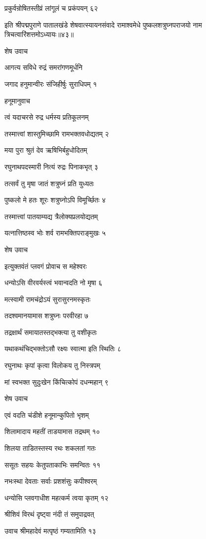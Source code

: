 प्रकुर्वन्रोषितस्तीव्रं लांगूलं च प्रकंपयन् ६२

इति श्रीपद्मपुराणे पातालखंडे शेषवात्स्यायनसंवादे रामाश्वमेधे पुष्कलशत्रुघ्नपराजयो नाम त्रिचत्वारिंशत्तमोऽध्यायः॥४३॥


शेष उवाच

आगत्य सविधे रुद्रं समरांगणमूर्धनि

जगाद हनुमान्वीरः संजिहीर्षुः सुराधिपम् १

हनूमानुवाच

त्वं यदाचरसे रुद्र धर्मस्य प्रतिकूलनम्

तस्मात्त्वां शास्तुमिच्छामि रामभक्तवधोद्यतम् २

मया पुरा श्रुतं देव ऋषिभिर्बहुधोदितम्

रघुनाथपदस्मारी नित्यं रुद्रः पिनाकभृत् ३

तत्सर्वं तु मृषा जातं शत्रुघ्नं प्रति युध्यतः

पुष्कलो मे हतः शूरः शत्रुघ्नोऽपि विमूर्च्छितः ४

तस्मात्त्वां पातयाम्यद्य त्रैलोक्यप्रलयोद्यतम्

यत्नात्तिष्ठस्व भोः शर्व रामभक्तिपराङ्मुखः ५

शेष उवाच

इत्युक्तवंतं प्लवगं प्रोवाच स महेश्वरः

धन्योऽसि वीरवर्यस्त्वं भवान्वदति नो मृषा ६

मत्स्वामी रामचंद्रोऽयं सुरासुरनमस्कृतः

तदश्वमानयामास शत्रुघ्नः परवीरहा ७

तद्रक्षार्थं समायातस्तद्भक्त्या तु वशीकृतः

यथाकथंचिद्भक्तोऽसौ रक्ष्यः स्वात्मा इति स्थितिः ८

रघुनाथः कृपां कृत्वा विलोकय तु निस्त्रपम्

मां स्वभक्त सुदुःखेन किंचित्कोपं दधन्महान् ९

शेष उवाच

एवं वदति चंडीशे हनूमान्कुपितो भृशम्

शिलामादाय महतीं ताडयामास तद्रथम् १०

शिलया ताडितस्तस्य रथः शकलतां गतः

ससूतः सहयः केतुपताकाभिः समन्वितः ११

नभःस्था देवताः सर्वाः प्रशशंसुः कपीश्वरम्

धन्योसि प्लवगाधीश महत्कर्म त्वया कृतम् १२

श्रीशिवं विरथं दृष्ट्वा नंदी तं समुपाद्रवत्

उवाच श्रीमहादेवं मत्पृष्ठं गम्यतामिति १३

